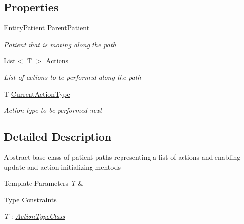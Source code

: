 \subsection*{Properties}
\begin{DoxyCompactItemize}
\item 
\hyperlink{class_general_health_care_elements_1_1_entities_1_1_entity_patient}{Entity\+Patient} \hyperlink{class_general_health_care_elements_1_1_general_classes_1_1_action_types_and_paths_1_1_patient_path_ad46aa5d47c3466188281267bc4db9475}{Parent\+Patient}
\begin{DoxyCompactList}\small\item\em Patient that is moving along the path \end{DoxyCompactList}\item 
List$<$ T $>$ \hyperlink{class_general_health_care_elements_1_1_general_classes_1_1_action_types_and_paths_1_1_patient_path_a2a19e895083abf5f0bd9b0ba70d07f1c}{Actions}
\begin{DoxyCompactList}\small\item\em List of actions to be performed along the path \end{DoxyCompactList}\item 
T \hyperlink{class_general_health_care_elements_1_1_general_classes_1_1_action_types_and_paths_1_1_patient_path_ace874a4844b1302e8152ef9fde6a8730}{Current\+Action\+Type}
\begin{DoxyCompactList}\small\item\em Action type to be performed next \end{DoxyCompactList}\end{DoxyCompactItemize}


\subsection{Detailed Description}
Abstract base class of patient paths representing a list of actions and enabling update and action initializing mehtods 


\begin{DoxyTemplParams}{Template Parameters}
{\em T} & \\
\hline
\end{DoxyTemplParams}
\begin{Desc}
\item[Type Constraints]\begin{description}
\item[{\em T} : {\em \hyperlink{class_general_health_care_elements_1_1_general_classes_1_1_action_types_and_paths_1_1_action_type_class}{Action\+Type\+Class}}]\end{description}
\end{Desc}


